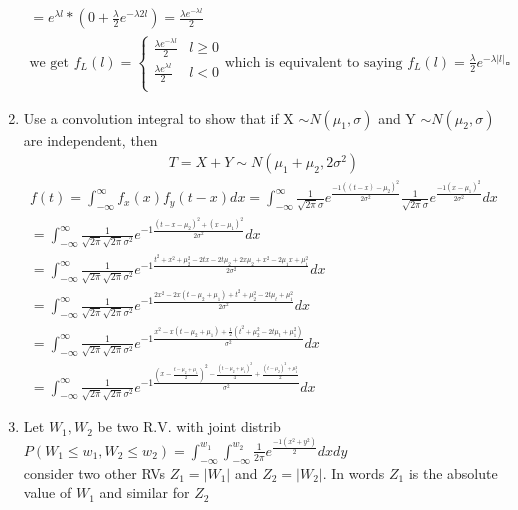 \documentclass[11pt]{article}
\begin{document}
\begin{enumerate}
\begin{gather}
	= e^{\lambda l} * (0+\frac{\lambda}{2}e^{-\lambda 2l}) = \frac{\lambda e^{-\lambda l}}{2} \\
	\text{we get  }
	f_L(l)=
	\begin{cases}
		\frac{\lambda e^{-\lambda l}}{2} & l \ge 0 \\
		\frac{\lambda e^{\lambda l}}{2} & l < 0\\
	\end{cases}
	\text{which is equivalent to saying } 	
	f_L(l) = \frac{\lambda}{2}e^{-\lambda|l|} \square
\end{gather}
\item Use a convolution integral to show that if X $\sim N(\mu_1,\sigma)$ and Y $\sim N(\mu_2,\sigma)$ are independent, then
\begin{gather}
	T=X+Y\sim N(\mu_1+\mu_2,2\sigma^2)
\end{gather}
\begin{gather}
	f(t)=\int_{-\infty}^{\infty}f_x(x)f_y(t-x)dx = \int_{-\infty}^{\infty} \frac{1}{\sqrt{2\pi}\sigma}e^{\frac{-1((t-x)-\mu_2)^2}{2\sigma^2}} \frac{1}{\sqrt{2\pi}\sigma}e^{\frac{-1(x-\mu_1)^2}{2\sigma^2}}dx\\
	=\int_{-\infty}^{\infty} \frac{1}{\sqrt{2\pi}\sqrt{2\pi}\sigma^2}e^{-1\frac{(t-x-\mu_2)^2+(x-\mu_1)^2}{2\sigma^2}}dx\\
	=\int_{-\infty}^{\infty} \frac{1}{\sqrt{2\pi}\sqrt{2\pi}\sigma^2}e^{-1\frac{t^2+x^2+\mu_2^2-2tx-2t\mu_2+2x\mu_2+x^2-2\mu_1x+\mu_1^2}{2\sigma^2}}dx\\
	=\int_{-\infty}^{\infty} \frac{1}{\sqrt{2\pi}\sqrt{2\pi}\sigma^2}e^{-1\frac{2x^2 -2x(t-\mu_2+\mu_1) + t^2 + \mu_2^2 -2t\mu_t +\mu_1^2}{2\sigma^2}}dx\\
	=\int_{-\infty}^{\infty} \frac{1}{\sqrt{2\pi}\sqrt{2\pi}\sigma^2}e^{-1\frac{x^2 -x(t-\mu_2+\mu_1) + \frac{1}{2}(t^2 + \mu_2^2 -2t\mu_t +\mu_1^2)}{\sigma^2}}dx\\
	=\int_{-\infty}^{\infty} \frac{1}{\sqrt{2\pi}\sqrt{2\pi}\sigma^2}e^{-1\frac{(x-\frac{t-\mu_2+\mu_1}{2})^2 - \frac{(t-\mu_2+\mu_1)^2}{4} + \frac{(t-\mu_2)^2 +\mu_1^2}{2}}{\sigma^2}}dx
\end{gather}
\item Let $W_1, W_2$ be two R.V. with joint distrib\\
$P(W_1\le w_1, W_2 \le w_2) = \int_{-\infty}^{w_1}\int_{-\infty}^{w_2} \frac{1}{2\pi}e^{\frac{-1(x^2+y^2)}{2}}dxdy$\\
consider two other RVs $Z_1 = |W_1|$ and $Z_2=|W_2|$. In words $Z_1$ is the absolute value of $W_1$ and similar for $Z_2$
\begin{enumerate}

\end{enumerate}
\end{enumerate}
\end{document}
